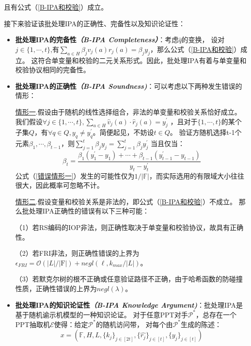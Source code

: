 \documentclass[zihao=-4]{ctexart}
\begin{document}
且有公式（\ref{B-IPA和校验}）成立。\par
接下来验证该批处理IPA的正确性、完备性以及知识论证性：\par
\begin{itemize}
  \item \textbf{批处理IPA的完备性\emph{（B-IPA Completeness）}}：考虑$\hat{q}$的变换，
        设对$j \in\{1,\cdots,t\}$,有$\sum_{a\in H}\beta_jv_j(a)r_j(a)=\beta_jy_j$，那么公式（\ref{B-IPA和校验}）成立。
        这符合单变量和校验的二元关系形式。因此，批处理IPA有着与单变量和校验协议相同的完备性。
  \item \textbf{批处理IPA的正确性\emph{（B-IPA Soundness)}}：可以考虑以下两种发生错误的情形：\par
        \underline{情形一}.假设由于随机的线性选择组合，非法的单变量和校验关系恰好成立。
        我们假设$\forall j \in\{1,\cdots,t\},\sum_{a\in H}\hat{v}_j(a)\cdot\hat{r}_j(a)=y_j^{\prime}$
        ，且对于$\{1,\cdots,t\}$的某个子集$Q$，有$\forall q \in Q,y_q\neq y_q^{\prime}$。简便起见，不妨设$t\in Q$。
        验证方随机选择t-1个元素$\beta_1,\cdots,\beta_{t-1}$，则$\sum_{j=1}^t\beta_jy_j=\sum_{j=1}^t\beta_jy_j^{\prime}$
        当且仅当：
        \begin{equation}\beta_t=\dfrac{\beta_1(y_1^{\prime}-y_1)+\cdots+\beta_{t-1}(y_{t-1}^{\prime}-y_{t-1})}{y_t-y_t^{\prime}} \label{错误情形一}\end{equation}
        公式（\ref{错误情形一}）发生的可能性仅为$1/|\mathbb{F}|$，而实际选用的有限域大小往往很大，因此概率可忽略不计。\par
        \underline{情形二}.假设变量和校验关系是非法的，即公式（\ref{B-IPA和校验}）不成立。
          那么批处理IPA正确性的错误有以下三种可能：\par
        （1）若RS编码的IOP非法，则正确性取决于单变量和校验协议，故具有正确性。\par
        （2）若FRI非法，则正确性错误的上界为$\epsilon_{FRI}=\mathcal{O}(|L|/|\mathrm{F}|)+negl(\ell,k_{max}/|L|)$。\par
        （3）若默克尔树的根不正确或任意验证路径不正确，由于哈希函数的防碰撞性质，正确性错误的上界为$negl(\lambda)$。
  \item \textbf{批处理IPA的知识论证性\emph{（B-IPA Knowledge Argument)}}：批处理IPA是基于随机谕示机模型的一种知识论证。
        对于任意PPT对手$\mathcal{P}^\ast$，总存在一个PPT抽取机$\mathcal{E}$使得：给定$\mathcal{P}^\ast$的随机访问带，
        对每个由$\mathcal{P}^\ast$生成的陈述：
        \begin{equation}
          x=(\mathbb{F},H,L,\{k_j\}_{j\in [2t]},\{\hat{r_j}\}_{j\in [t]},\{y_j\}_{j \in [t]})

\end{equation}
\end{itemize}
\end{document}
